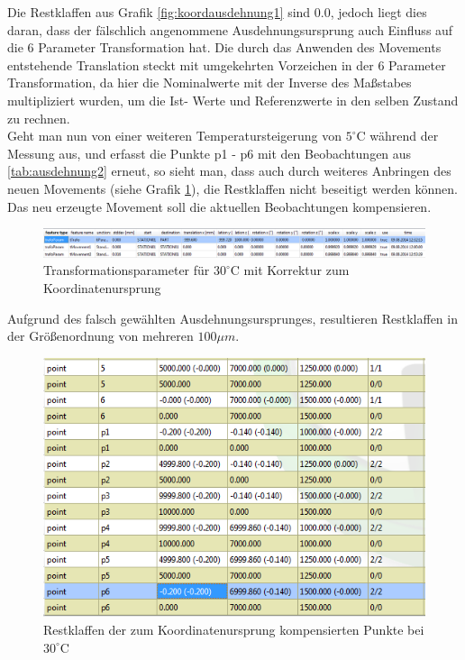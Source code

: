 Die Restklaffen aus Grafik \ref{fig:koordausdehnung1} sind 0.0, jedoch liegt dies daran, dass der fälschlich angenommene Ausdehnungsursprung auch Einfluss auf die 6 Parameter Transformation hat. Die durch das Anwenden des Movements entstehende Translation steckt mit umgekehrten Vorzeichen in der 6 Parameter Transformation, da hier die Nominalwerte mit der Inverse des Maßstabes multipliziert wurden, um die Ist- Werte und Referenzwerte in den selben Zustand zu rechnen.\\
Geht man nun von einer weiteren Temperatursteigerung von $5^\circ\text{C}$ während der Messung aus, und erfasst die Punkte p1 - p6 mit den Beobachtungen aus \ref{tab:ausdehnung2} erneut, so sieht man, dass auch durch weiteres Anbringen des neuen Movements (siehe Grafik \ref{fig:trafoparamausdehnung2}), die Restklaffen nicht beseitigt werden können. Das neu erzeugte Movement soll die aktuellen Beobachtungen kompensieren.
\begin{figure}[H]
\label{fig:trafoparamausdehnung2}
\centering
	\includegraphics[scale=1.6]{bilder/Testmessung/ursprungecke/trafoParamausdehnung2}
	\caption{Transformationsparameter für $30^\circ\text{C}$ mit Korrektur zum Koordinatenursprung}
\end{figure}

Aufgrund des falsch gewählten Ausdehnungsursprunges, resultieren Restklaffen in der Größenordnung von mehreren $100\mu m$.

\begin{figure}[h]
\label{fig:koordausdehnung2}
\centering
	\includegraphics[scale=2.0]{bilder/Testmessung/ursprungecke/koordsausdehnung2}
	\caption{Restklaffen der zum Koordinatenursprung kompensierten Punkte bei $30^\circ\text{C}$}
\end{figure}


